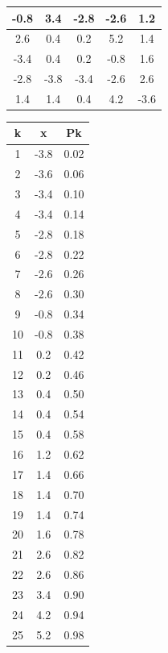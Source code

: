 \documentclass[
  10pt,
  ignorenonframetext,
]{beamer}
\begin{document}
\begin{frame}{}
\protect\hypertarget{section-38}{}
\begin{minipage}{\textwidth}

\begin{multicols}{2}



\begin{table}
\centering\begingroup\fontsize{9}{11}\selectfont

\begin{tabular}{c|c|c|c|c}
\hline
-0.8 & 3.4 & -2.8 & -2.6 & 1.2\\
\hline
2.6 & 0.4 & 0.2 & 5.2 & 1.4\\
\hline
-3.4 & 0.4 & 0.2 & -0.8 & 1.6\\
\hline
-2.8 & -3.8 & -3.4 & -2.6 & 2.6\\
\hline
1.4 & 1.4 & 0.4 & 4.2 & -3.6\\
\hline
\end{tabular}
\endgroup{}
\end{table}


\begin{table}
\centering\begingroup\fontsize{7}{9}\selectfont

\begin{tabular}{c|c|c}
\hline
k & x & Pk\\
\hline
1 & -3.8 & 0.02\\
\hline
2 & -3.6 & 0.06\\
\hline
3 & -3.4 & 0.10\\
\hline
4 & -3.4 & 0.14\\
\hline
5 & -2.8 & 0.18\\
\hline
6 & -2.8 & 0.22\\
\hline
7 & -2.6 & 0.26\\
\hline
8 & -2.6 & 0.30\\
\hline
9 & -0.8 & 0.34\\
\hline
10 & -0.8 & 0.38\\
\hline
11 & 0.2 & 0.42\\
\hline
12 & 0.2 & 0.46\\
\hline
13 & 0.4 & 0.50\\
\hline
14 & 0.4 & 0.54\\
\hline
15 & 0.4 & 0.58\\
\hline
16 & 1.2 & 0.62\\
\hline
17 & 1.4 & 0.66\\
\hline
18 & 1.4 & 0.70\\
\hline
19 & 1.4 & 0.74\\
\hline
20 & 1.6 & 0.78\\
\hline
21 & 2.6 & 0.82\\
\hline
22 & 2.6 & 0.86\\
\hline
23 & 3.4 & 0.90\\
\hline
24 & 4.2 & 0.94\\
\hline
25 & 5.2 & 0.98\\
\hline
\end{tabular}
\endgroup{}
\end{table}





\end{multicols}
\end{minipage}
\end{frame}
\end{document}
